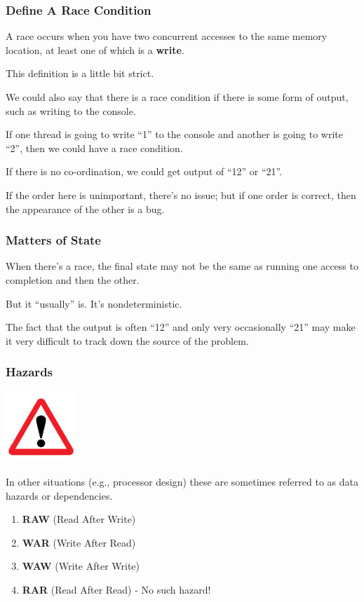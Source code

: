 \begin{frame}
\frametitle{Define A Race Condition}

A race occurs when you have two concurrent accesses to the
same memory location, at least one of which is a {\bf write}.

This definition is a little bit strict. 

We could also say that there is a race condition if there is some form of output, such as writing to the console. 

If one thread is going to write ``1'' to the console and another is going to write ``2'', then we could have a race condition. 

If there is no co-ordination, we could get output of ``12'' or ``21''. 

If the order here is unimportant, there's no issue; but if one order is correct, then the appearance of the other is a bug.

\end{frame}



\begin{frame}
\frametitle{Matters of State}

When there's a race, the final state may not be the same as running
one access to completion and then the other. 

But it ``usually'' is.  It's nondeterministic. 

The fact that the output is often ``12'' and only very occasionally ``21'' may make it very difficult to track down the source of the problem. 

\end{frame}



\begin{frame}
\frametitle{Hazards}

\begin{center}
	\includegraphics[width=0.2\textwidth]{images/hazard.png}
\end{center}

In other situations (e.g., processor design) these are sometimes referred to as data hazards or dependencies. 

\begin{enumerate}
	\item \textbf{RAW} (Read After Write)	
	\item \textbf{WAR} (Write After Read)
	\item \textbf{WAW} (Write After Write)
	\item \textbf{RAR} (Read After Read) - No such hazard! 
\end{enumerate}


\end{frame}




